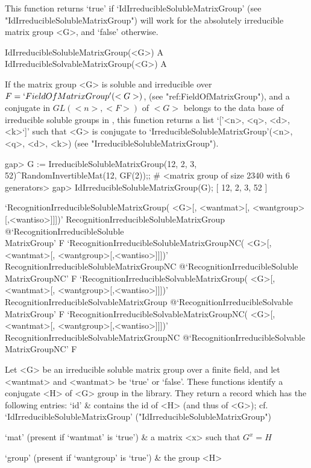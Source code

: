 This function returns `true' if `IdIrreducibleSolubleMatrixGroup' (see
"IdIrreducibleSolubleMatrixGroup") will work for the absolutely irreducible matrix group <G>, and `false' otherwise.


\>IdIrreducibleSolubleMatrixGroup(<G>) A
\>IdIrreducibleSolvableMatrixGroup(<G>) A

If the matrix group <G> is soluble and irreducible over $F
= `FieldOfMatrixGroup'(<G>)$, (see "ref:FieldOfMatrixGroup"), and a conjugate in
$GL(<n>, <F>)$ of $<G>$ belongs to the data base of  irreducible soluble groups in
{\IRREDSOL}, this function returns a list `['<n>, <q>, <d>, <k>`]' such that <G> is
conjugate to  `IrreducibleSolubleMatrixGroup'(<n>, <q>, <d>, <k>) (see
"IrreducibleSolubleMatrixGroup").

\beginexample
gap> G := IrreducibleSolubleMatrixGroup(12, 2, 3, 52)^RandomInvertibleMat(12, GF(2));;
# <matrix group of size 2340 with 6 generators>
gap> IdIrreducibleSolubleMatrixGroup(G);
[ 12, 2, 3, 52 ]
\endexample


\>`RecognitionIrreducibleSolubleMatrixGroup(%
   <G>[, <wantmat>[, <wantgroup>[,<wantiso>]]])'%
{RecognitionIrreducibleSolubleMatrixGroup}%
@{`RecognitionIrreducibleSoluble\\MatrixGroup'} F
\>`RecognitionIrreducibleSolubleMatrixGroupNC(%
   <G>[, <wantmat>[, <wantgroup>[,<wantiso>]]])'%
{RecognitionIrreducibleSolubleMatrixGroupNC}%
@{`RecognitionIrreducibleSoluble\\MatrixGroupNC'} F
\>`RecognitionIrreducibleSolvableMatrixGroup(%
   <G>[, <wantmat>[, <wantgroup>[,<wantiso>]]])'%
{RecognitionIrreducibleSolvableMatrixGroup}%
@{`RecognitionIrreducibleSolvable\\MatrixGroup'} F
\>`RecognitionIrreducibleSolvableMatrixGroupNC(%
   <G>[, <wantmat>[, <wantgroup>[,<wantiso>]]])'%
{RecognitionIrreducibleSolvableMatrixGroupNC}%
@{`RecognitionIrreducibleSolvable\\MatrixGroupNC'} F

Let <G> be an irreducible soluble matrix group over a finite field, and let
<wantmat> and <wantmat> be `true' or `false'. 
These functions identify a conjugate <H> of <G> group in the library. 
They return a record which has the following entries:
\beginitems
`id' &  contains the id of <H> (and thus of <G>); 
    cf. `IdIrreducibleSolubleMatrixGroup'  ("IdIrreducibleSolubleMatrixGroup")

`mat' (present if `wantmat' is `true') &
    a matrix <x> such that $G^x = H$

`group' (present if `wantgroup' is `true') & the group <H> 

